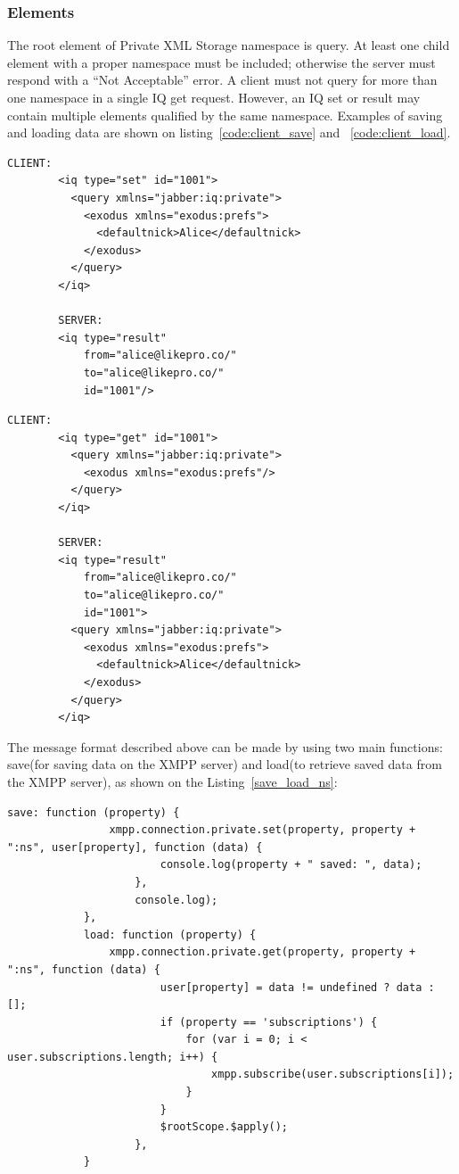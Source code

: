	\subsubsection{Elements}
	The root element of Private XML Storage namespace is query. At least one child element with a proper namespace must be included; otherwise the server must respond with a ``Not Acceptable'' error. A client must not query for more than one namespace in a single IQ get request. However, an IQ set or result may contain multiple elements qualified by the same namespace. Examples of saving and loading data are shown on listing~\ref{code:client_save} and ~\ref{code:client_load}.

    \begin{lstlisting}[label=code:client_save,caption=Client Stores Private Data]
		CLIENT:
		<iq type="set" id="1001">
		  <query xmlns="jabber:iq:private">
		    <exodus xmlns="exodus:prefs">
		      <defaultnick>Alice</defaultnick>
		    </exodus>
		  </query>
		</iq>

		SERVER:
		<iq type="result"
		    from="alice@likepro.co/"
		    to="alice@likepro.co/"
		    id="1001"/>
    \end{lstlisting}

     \begin{lstlisting}[label=code:client_load,caption=Client Retrieves Private Data]
		CLIENT:
		<iq type="get" id="1001">
		  <query xmlns="jabber:iq:private">
		    <exodus xmlns="exodus:prefs"/>
		  </query>
		</iq>

		SERVER:
		<iq type="result"
		    from="alice@likepro.co/"
		    to="alice@likepro.co/"
		    id="1001">
		  <query xmlns="jabber:iq:private">
		    <exodus xmlns="exodus:prefs">
		      <defaultnick>Alice</defaultnick>
		    </exodus>
		  </query>
		</iq>
    \end{lstlisting}

    The message format described above can be made by using two main functions: save(for saving data on the XMPP server) and load(to retrieve saved data from the XMPP server), as shown on the Listing~\ref{save_load_ns}:
	\begin{lstlisting}[label=save_load_ns,caption=Snippet of Save/Load preferences to a private namespace]
	      	save: function (property) {
	            xmpp.connection.private.set(property, property + ":ns", user[property], function (data) {
	                    console.log(property + " saved: ", data);
	                },
	                console.log);
	        },
	        load: function (property) {
	            xmpp.connection.private.get(property, property + ":ns", function (data) {
	                    user[property] = data != undefined ? data : [];
	                    if (property == 'subscriptions') {
	                        for (var i = 0; i < user.subscriptions.length; i++) {
	                            xmpp.subscribe(user.subscriptions[i]);
	                        }
	                    }
	                    $rootScope.$apply();
	                },
	        }
	\end{lstlisting}


